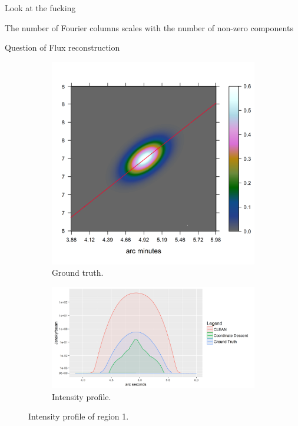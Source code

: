Look at the fucking 

The number of Fourier columns scales with the number of non-zero components




Question of Flux reconstruction



\begin{figure}[h]
	\centering
	\begin{subfigure}[b]{0.3\linewidth}
		\includegraphics[width=\linewidth, trim={0.4in, 0.9in, 3.2in, 1.8in}, clip]{./chapters/20.results/mixed/mixed_cut_model_line.png}
		\caption{Ground truth.}
		\label{results:mixed:cut0:img}
	\end{subfigure}
	\begin{subfigure}[b]{0.6\linewidth}
		\includegraphics[width=\linewidth, trim={0, 0, 0.2in, 0.2in}, clip]{./chapters/20.results/mixed/mixed_cut0.png}
		\caption{Intensity profile.}
		\label{results:mixed:cut0:profile}
	\end{subfigure}
	\caption{Intensity profile of region 1.}
	\label{results:mixed:cut0:contour}
\end{figure}


